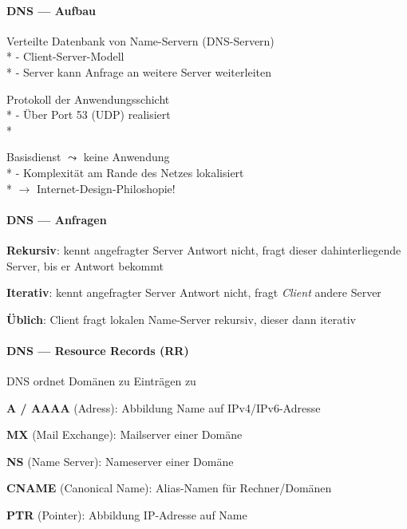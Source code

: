 \paragraph{DNS --- Aufbau}
\begin{items}
  \item Verteilte Datenbank von Name-Servern (DNS-Servern) \\*
    - Client-Server-Modell \\*
    - Server kann Anfrage an weitere Server weiterleiten
  \item Protokoll der Anwendungsschicht \\*
    - Über Port 53 (UDP) realisiert \\*
  \item Basisdienst \( \leadsto \) keine Anwendung \\*
    - Komplexität am Rande des Netzes lokalisiert \\*
    \phantom{-} \( \to \) Internet-Design-Philoshopie!
\end{items}

\paragraph{DNS --- Anfragen}
\begin{items}
  \item \textbf{Rekursiv}: kennt angefragter Server Antwort nicht, fragt dieser dahinterliegende Server, bis er Antwort bekommt
  \item \textbf{Iterativ}: kennt angefragter Server Antwort nicht, fragt \emph{Client} andere Server
  \item \textbf{Üblich}: Client fragt lokalen Name-Server rekursiv, dieser dann iterativ
\end{items}

\paragraph{DNS --- Resource Records (RR)}
\begin{items}
  \item DNS ordnet Domänen zu Einträgen zu
  \item \textbf{A / AAAA} (Adress): Abbildung Name auf IPv4/IPv6-Adresse
  \item \textbf{MX} (Mail Exchange): Mailserver einer Domäne
  \item \textbf{NS} (Name Server): Nameserver einer Domäne
  \item \textbf{CNAME} (Canonical Name): Alias-Namen für Rechner/Domänen
  \item \textbf{PTR} (Pointer): Abbildung IP-Adresse auf Name
\end{items}